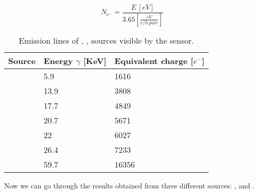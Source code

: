 \begin{equation}
N_{e^{-}} = \frac{E \, [eV]}{3.65 [\frac{eV}{e/h \, pair}]}
\label{eq:energy_electron_conv}
\end{equation}



\begin{table}[h!]
\centering
\begin{tabular}{>{} C{3cm}|C{2.8cm}|C{2.8cm}}
Source & Energy $\gamma$ [KeV] & Equivalent charge [$e^{-}$]\\[2ex]
\hline
{} & 5.9 & 1616\\[0.5ex]
\hline
{} & 13.9 & 3808\\[0.5ex]
\hline
{} & 17.7 & 4849\\[0.5ex]
\hline
{} & 20.7 & 5671\\[0.5ex]
\hline
{} & 22 & 6027\\[0.5ex]
\hline
{} & 26.4 & 7233\\[0.5ex]
\hline
{} & 59.7 & 16356\\
\hline
\end{tabular}
\caption{Emission lines of , ,  sources visible by the sensor.}
\label{tab:radio_sources}
\end{table}


Now we can go through the results obtained from three different sources: ,  and .
\subsection{}

